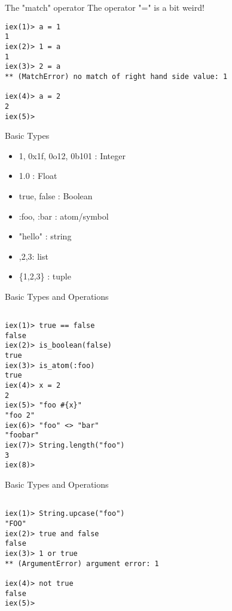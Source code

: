 \documentclass{beamer}
\begin{document}
\begin{frame}[fragile]{The "match" operator}
The operator "=" is a bit weird!

\begin{verbatim}
iex(1)> a = 1
1
iex(2)> 1 = a
1
iex(3)> 2 = a
** (MatchError) no match of right hand side value: 1

iex(4)> a = 2
2
iex(5)>
\end{verbatim}

\end{frame}

\begin{frame}[fragile]{Basic Types}

\begin{itemize}
   \item 1, 0x1f, 0o12, 0b101 : Integer
   \item 1.0 : Float
   \item true, false : Boolean
   \item :foo, :bar : atom/symbol
   \item "hello" : string
   \item {},2,3\rbrack : list
   \item \{1,2,3\} : tuple
\end{itemize}

\end{frame}

\begin{frame}[fragile]{Basic Types and Operations}

\begin{verbatim}

iex(1)> true == false
false
iex(2)> is_boolean(false)
true
iex(3)> is_atom(:foo)
true
iex(4)> x = 2
2
iex(5)> "foo #{x}"
"foo 2"
iex(6)> "foo" <> "bar"
"foobar"
iex(7)> String.length("foo")
3
iex(8)>

\end{verbatim}

\end{frame}

\begin{frame}[fragile]{Basic Types and Operations}

\begin{verbatim}

iex(1)> String.upcase("foo")
"FOO"
iex(2)> true and false
false
iex(3)> 1 or true 
** (ArgumentError) argument error: 1

iex(4)> not true
false
iex(5)>

\end{verbatim}

\end{frame}
\end{document}
